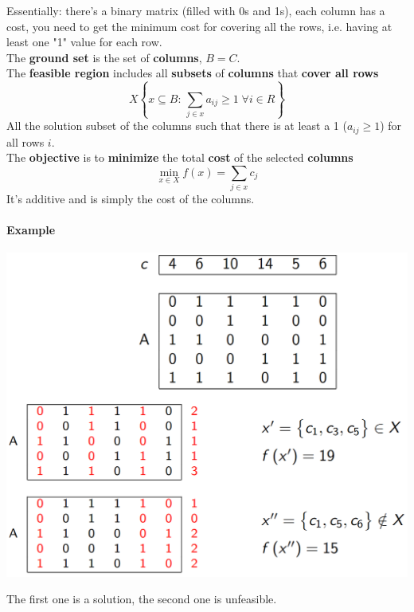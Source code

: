 Essentially: there's a binary matrix (filled with 0s and 1s), each column has a cost, you need to get the minimum cost for covering all the rows, i.e. having at least one "1" value for each row.\\

The \textbf{ground set} is the set of \textbf{columns}, $B = C$.\\

The \textbf{feasible region} includes all \textbf{subsets} of \textbf{columns} that \textbf{cover all rows}
$$ X \left\{ x \subseteq B : \, \sum_{j \in x} a_{ij} \geq 1 \; \forall i \in R \right\}$$
All the solution subset of the columns such that there is at least a 1 ($a_{ij} \geq 1$) for all rows $i$.\\

The \textbf{objective} is to \textbf{minimize} the total \textbf{cost} of the selected \textbf{columns}
$$ \min_{x \in X} f(x) = \sum_{j \in x} c_j$$
It's additive and is simply the cost of the columns.\\

\newpage

\paragraph{Example}
\begin{center}
	\includegraphics[width=\columnwidth]{img/SCP1}
\end{center}
The first one is a solution, the second one is unfeasible.\\

